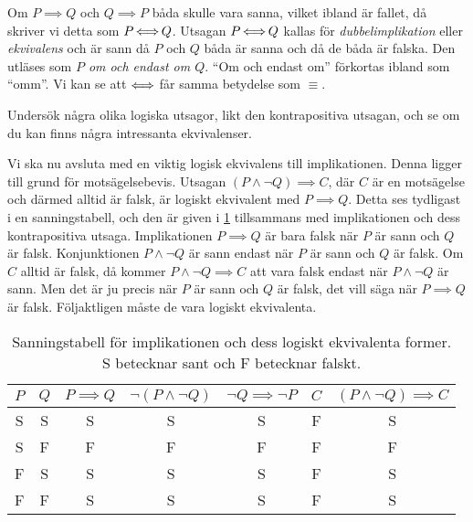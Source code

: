 Om \(P\implies Q\) och \(Q\implies P\) båda skulle vara sanna, vilket ibland är 
fallet, då skriver vi detta som \(P\operatorname{\Longleftrightarrow} Q\).
Utsagan \(P\operatorname{\Longleftrightarrow} Q\) kallas för 
\emph{dubbelimplikation} eller
\emph{ekvivalens} och är sann då \(P\) och \(Q\) båda 
är sanna och då de båda är falska.
Den utläses som \emph{\(P\) om och endast om \(Q\)}.
\enquote{Om och endast om} förkortas ibland som \enquote{omm}.
Vi kan se att \(\operatorname{\Longleftrightarrow}\) får samma betydelse som \(\equiv\).

\begin{exercise}
  Undersök några olika logiska utsagor, likt den kontrapositiva utsagan, och se 
  om du kan finns några intressanta ekvivalenser.
\end{exercise}

Vi ska nu avsluta med en viktig logisk ekvivalens till implikationen.
Denna ligger till grund för motsägelsebevis.
Utsagan \((P\land\lnot Q)\implies C\), där \(C\) är en motsägelse och
därmed alltid är falsk, är logiskt ekvivalent med \(P\implies Q\).
Detta ses tydligast i en sanningstabell, och den är given i
\cref{tbl:SanningImplikation} tillsammans med implikationen och dess
kontrapositiva utsaga.
Implikationen \(P\implies Q\) är bara falsk när \(P\) är sann och \(Q\) är
falsk.
Konjunktionen \(P\land\lnot Q\) är sann endast när \(P\) är sann och \(Q\) är
falsk.
Om \(C\) alltid är falsk, då kommer \(P\land\lnot Q\implies C\) att vara falsk
endast när \(P\land\lnot Q\) är sann.
Men det är ju precis när \(P\) är sann och \(Q\) är falsk, det vill säga när
\(P\implies Q\) är falsk.
Följaktligen måste de vara logiskt ekvivalenta.

\begin{table}
  \caption{%
    Sanningstabell för implikationen och dess logiskt ekvivalenta former.
    S betecknar sant och F betecknar falskt.
  }
  \begin{tabular}{ccccccc}
    \(P\) &
    \(Q\) &
    \(P\implies Q\) &
    \(\lnot(P\land \lnot Q)\) &
    \(\lnot Q\implies \lnot P\) &
    \(C\) & \((P\land\lnot Q)\implies C\) \\
    \toprule
    S & S & S & S & S & F & S \\
    S & F & F & F & F & F & F \\
    F & S & S & S & S & F & S \\
    F & F & S & S & S & F & S \\
    \bottomrule
  \end{tabular}\label{tbl:SanningImplikation}
\end{table}


